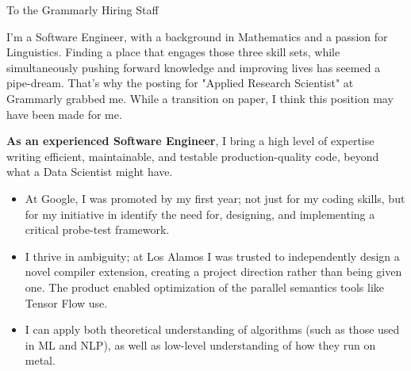 \documentclass[sans, a4paper]{article}
\newcommand{\cvcolor}[1]{{\color{MidnightBlue}#1}}
\renewcommand{\hl}[1]{\cvcolor{\textbf{#1}}}
\begin{document}
\begin{adjustwidth}{40pt}{40pt}

  To the Grammarly Hiring Staff \par \bigskip

  I'm a Software Engineer, with a background in Mathematics and a passion for
  Linguistics. Finding a place that engages those three skill sets, while
  simultaneously pushing forward knowledge and improving lives has seemed a
  pipe-dream. That's why the posting for "Applied Research Scientist" at
  Grammarly grabbed me. While a transition on paper, I think this position may
  have been made for me. \medskip


  \hl{As an experienced Software Engineer}, I bring a high level of expertise
  writing efficient, maintainable, and testable production-quality code, beyond
  what a Data Scientist might have.

  \begin{itemize}
    \item At Google, I was promoted by my first year; not just for my coding
      skills, but for my initiative in identify the need for, designing, and
      implementing a critical probe-test framework.
    \item I thrive in ambiguity; at Los Alamos I was trusted to independently
      design a novel compiler extension, creating a project direction rather
      than being given one. The product enabled optimization of the parallel
      semantics tools like Tensor Flow use.
    \item I can apply both theoretical understanding of algorithms (such as
      those used in ML and NLP), as well as low-level understanding of how they
      run on metal.

  \end{itemize} \medskip


\end{adjustwidth}
\end{document}
